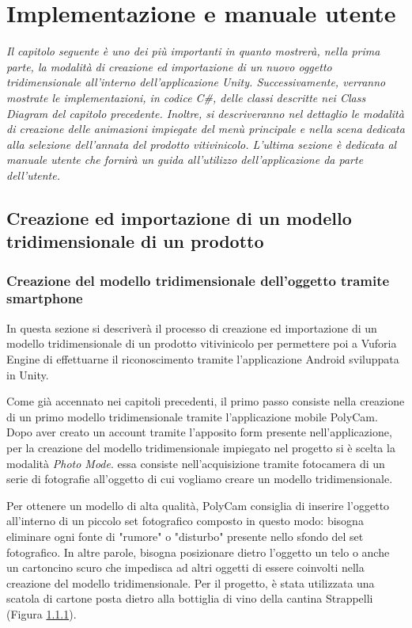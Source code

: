 \chapter{Implementazione e manuale utente}

\begin{preamble}
{\em Il capitolo seguente è uno dei più importanti in quanto mostrerà, nella prima parte, la modalità di creazione ed importazione di un nuovo oggetto tridimensionale all'interno dell'applicazione Unity. \newline \indent Successivamente, verranno mostrate le implementazioni, in codice C\#, delle classi descritte nei Class Diagram del capitolo precedente. Inoltre, si descriveranno nel dettaglio le modalità di creazione delle animazioni impiegate del menù principale e nella scena dedicata alla selezione dell'annata del prodotto vitivinicolo. \newline \indent L'ultima sezione è dedicata al manuale utente che fornirà un guida all'utilizzo dell'applicazione da parte dell'utente.}
\end{preamble}

\section{Creazione ed importazione di un modello tridimensionale di un prodotto}
\subsection{Creazione del modello tridimensionale dell'oggetto tramite smartphone}

In questa sezione si descriverà il processo di creazione ed importazione di un modello tridimensionale di un prodotto vitivinicolo per permettere poi a Vuforia Engine di effettuarne il riconoscimento tramite l'applicazione Android sviluppata in Unity.

Come già accennato nei capitoli precedenti, il primo passo consiste nella creazione di un primo modello tridimensionale tramite l'applicazione mobile PolyCam. Dopo aver creato un account tramite l'apposito form presente nell'applicazione, per la creazione del modello tridimensionale impiegato nel progetto si è scelta la modalità \textit{Photo Mode}. essa consiste nell'acquisizione tramite fotocamera di un serie di fotografie all'oggetto di cui vogliamo creare un modello tridimensionale.

Per ottenere un modello di alta qualità, PolyCam consiglia di inserire l'oggetto all'interno di un piccolo set fotografico composto in questo modo: bisogna eliminare ogni fonte di "rumore" o "disturbo" presente nello sfondo del set fotografico. In altre parole, bisogna posizionare dietro l'oggetto un telo o anche un cartoncino scuro che impedisca ad altri oggetti di essere coinvolti nella creazione del modello tridimensionale. Per il progetto, è stata utilizzata una scatola di cartone posta dietro alla bottiglia di vino della cantina Strappelli (Figura \ref{}).

